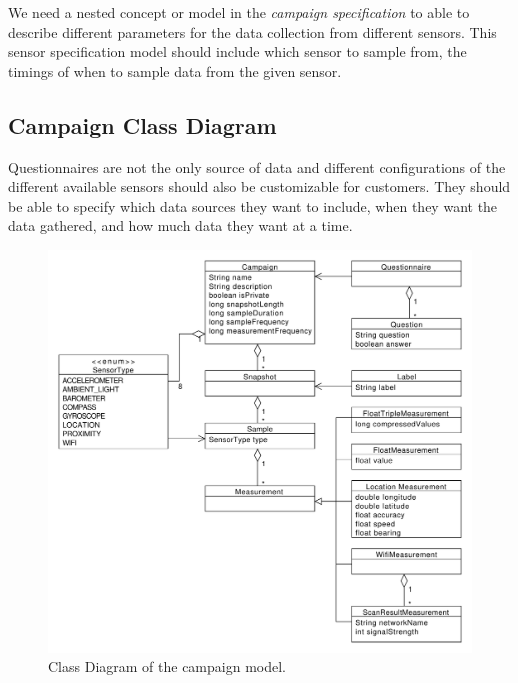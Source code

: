 We need a nested concept or model in the \textit{campaign specification} to able to describe different parameters for the data collection from different sensors. This sensor specification model should include which sensor to sample from, the timings of when to sample data from the given sensor. 


\subsection{Campaign Class Diagram}
\label{sub:campagin_class_diagram}

Questionnaires are not the only source of data and different configurations of the different available sensors should also be customizable for customers. They should be able to specify which data sources they want to include, when they want the data gathered, and how much data they want at a time. 


\begin{figure}[!htbp]
    \centering
    \includegraphics[width=\textwidth]{graphic/data_modeling/model_class_diagram.pdf}
    \caption{Class Diagram of the campaign model.}
    \label{fig:model_class_diagram}
\end{figure}
\FloatBarrier

